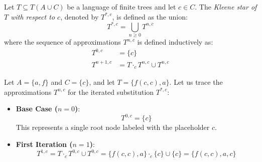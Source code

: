 \begin{definition}
Let $T \subseteq T(A \cup C)$ be a language of finite trees and let $c \in C$. The \emph{Kleene star of $T$ with respect to $c$}, denoted by $T^{*, c}$, is defined as the union:
$$T^{*, c} = \bigcup_{n \ge 0} T^{n, c}$$
where the sequence of approximations $T^{n, c}$ is defined inductively as:
\begin{align*}
    T^{0, c} &= \{c\} \\
    T^{n+1, c} &= T \cdot_c T^{n, c} \cup T^{n, c}
\end{align*}
\end{definition}

\begin{example}
Let $A = \{a, f\}$ and $C = \{c\}$, and let $T = \{ f(c, c), a \}$. Let us trace the approximations $T^{n, c}$ for the iterated substitution $T^{*, c}$:
\begin{itemize}
    \item \textbf{Base Case ($n=0$)}:
    $$T^{0, c} = \{c\}$$
    This represents a single root node labeled with the placeholder $c$.
    
    \item \textbf{First Iteration ($n=1$)}:
    $$T^{1, c} = T \cdot_c T^{0, c} \cup T^{0, c} = \{ f(c, c), a \} \cdot_c \{c\} \cup \{c\} = \{ f(c, c), a, c \}$$
    

\end{itemize}
\end{example}
